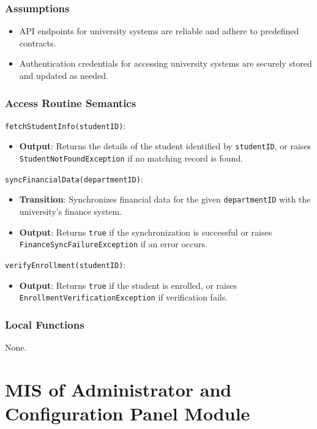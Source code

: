 \documentclass[12pt, titlepage]{article}
\begin{document}
\subsubsection{Assumptions}
\begin{itemize}
    \item API endpoints for university systems are reliable and adhere to predefined contracts.
    \item Authentication credentials for accessing university systems are securely stored and updated as needed.
\end{itemize}

\subsubsection{Access Routine Semantics}

\noindent \texttt{fetchStudentInfo(studentID)}:
\begin{itemize}
    \item \textbf{Output}: Returns the details of the student identified by \texttt{studentID}, or raises \texttt{StudentNotFoundException} if no matching record is found.
\end{itemize}

\noindent \texttt{syncFinancialData(departmentID)}:
\begin{itemize}
    \item \textbf{Transition}: Synchronizes financial data for the given \texttt{departmentID} with the university’s finance system.
    \item \textbf{Output}: Returns \texttt{true} if the synchronization is successful or raises \texttt{FinanceSyncFailureException} if an error occurs.
\end{itemize}

\noindent \texttt{verifyEnrollment(studentID)}:
\begin{itemize}
    \item \textbf{Output}: Returns \texttt{true} if the student is enrolled, or raises \texttt{EnrollmentVerificationException} if verification fails.
\end{itemize}

\subsubsection{Local Functions}
None.

\section{MIS of Administrator and Configuration Panel Module}
\end{document}
